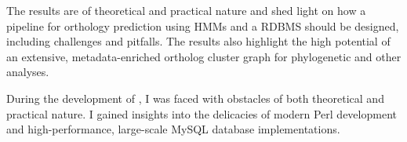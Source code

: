 The results are of theoretical and practical nature and shed light on how a
pipeline for orthology prediction using HMMs and a RDBMS should be designed,
including challenges and pitfalls. The results also highlight the high
potential of an extensive, metadata-enriched ortholog cluster graph for
phylogenetic and other analyses. 

During the development of \pname, I was faced with obstacles of both theoretical
and practical nature. I gained insights into the delicacies of modern Perl
development and high-performance, large-scale MySQL database implementations.
